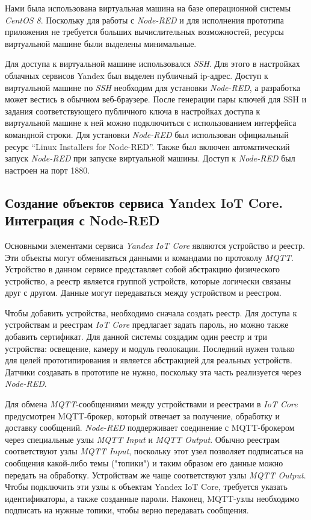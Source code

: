 Нами была использована виртуальная машина на базе операционной системы \textit{CentOS 8}. Поскольку для работы с \textit{Node-RED} и для исполнения прототипа приложения не требуется больших вычислительных возможностей, ресурсы виртуальной машине были выделены минимальные.

Для доступа к виртуальной машине использовался \textit{SSH}. Для этого в настройках облачных сервисов Yandex был выделен публичный ip-адрес. Доступ к виртуальной машине по \textit{SSH} необходим для установки \textit{Node-RED}, а разработка может вестись в обычном веб-браузере. После генерации пары ключей для SSH и задания соответствующего публичного ключа в настройках доступа к виртуальной машине к ней можно подключиться с использованием интерфейса командной строки. Для установки \textit{Node-RED} был использован официальный ресурс ``Linux Installers for Node-RED''. Также был включен автоматический запуск \textit{Node-RED} при запуске виртуальной машины. Доступ к \textit{Node-RED} был настроен на порт 1880.

\subsection{Создание объектов сервиса Yandex IoT Core. Интеграция с Node-RED}
\label{sec_SH_tec_impl_node_red_integration}

Основными элементами сервиса \textit{Yandex IoT Core} являются устройство и реестр. Эти объекты могут обмениваться данными и командами по протоколу \textit{MQTT}. Устройство в данном сервисе представляет собой абстракцию физического устройство, а реестр является группой устройств, которые логически связаны друг с другом. Данные могут передаваться между устройством и реестром.

Чтобы добавить устройства, необходимо сначала создать реестр. Для доступа к устройствам и реестрам \textit{IoT Core} предлагает задать пароль, но можно также добавить сертификат. Для данной системы создадим один реестр и три устройства: освещение, камеру и модуль геолокации. Последний нужен только для целей прототипирования и является абстракцией для реальных устройств. Датчики создавать в прототипе не нужно, поскольку эта часть реализуется через \textit{Node-RED}.

Для обмена \textit{MQTT}-сообщениями между устройствами и реестрами в \textit{IoT Core} предусмотрен MQTT-брокер, который отвечает за получение, обработку и доставку сообщений. \textit{Node-RED} поддерживает соединение с MQTT-брокером через специальные узлы \textit{MQTT Input} и \textit{MQTT Output}. Обычно реестрам соответствуют узлы \textit{MQTT Input}, поскольку этот узел позволяет подписаться на сообщения какой-либо темы ("топики"{}) и таким образом его данные можно передать на обработку. Устройствам же чаще соответствуют узлы \textit{MQTT Output}. Чтобы подключить эти узлы к объектам Yandex IoT Core, требуется указать идентификаторы, а также созданные пароли. Наконец, MQTT-узлы необходимо подписать на нужные топики, чтобы верно передавать сообщения.

